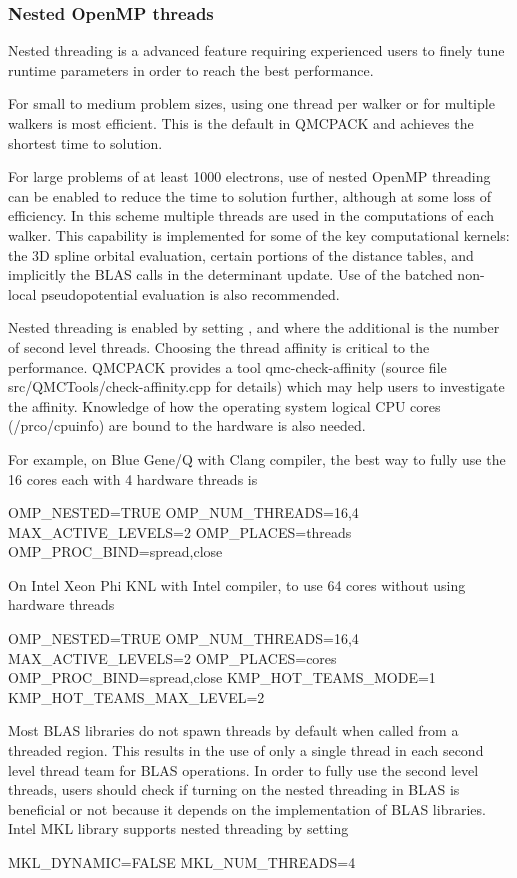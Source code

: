 \subsubsection{Nested OpenMP threads}
Nested threading is a advanced feature requiring experienced users to finely tune runtime parameters in order to reach the best performance.  

For small to medium problem sizes, using one thread per walker or for multiple walkers is most efficient. This is the default in QMCPACK and achieves the shortest time to solution.

For large problems of at least 1000 electrons, use of nested OpenMP threading can be enabled to reduce the time to solution further, although at some loss of efficiency. In this scheme multiple threads are used in the computations of each walker. This capability is implemented for some of the key computational kernels: the 3D spline orbital evaluation, certain portions of the distance tables, and implicitly the BLAS calls in the determinant update. Use of the batched non-local pseudopotential evaluation is also recommended.

Nested threading is enabled by setting ,  and  where the additional  is the number of second level threads.  Choosing the thread affinity is critical to the performance.  QMCPACK provides a tool qmc-check-affinity (source file src/QMCTools/check-affinity.cpp for details) which may help users to investigate the affinity. Knowledge of how the operating system logical CPU cores (/prco/cpuinfo) are bound to the hardware is also needed.

For example, on Blue Gene/Q with Clang compiler, the best way to fully use the 16 cores each with 4 hardware threads is
\begin{shade}
OMP_NESTED=TRUE
OMP_NUM_THREADS=16,4
MAX_ACTIVE_LEVELS=2
OMP_PLACES=threads
OMP_PROC_BIND=spread,close
\end{shade}

On Intel Xeon Phi KNL with Intel compiler, to use 64 cores without using hardware threads
\begin{shade}
OMP_NESTED=TRUE
OMP_NUM_THREADS=16,4
MAX_ACTIVE_LEVELS=2
OMP_PLACES=cores
OMP_PROC_BIND=spread,close
KMP_HOT_TEAMS_MODE=1
KMP_HOT_TEAMS_MAX_LEVEL=2
\end{shade}

Most BLAS libraries do not spawn threads by default when called from a threaded region.
This results in the use of only a single thread in each second level thread team for BLAS operations. In order to fully use the second level threads,
users should check if turning on the nested threading in BLAS is beneficial or not
because it depends on the implementation of BLAS libraries.
Intel MKL library supports nested threading by setting
\begin{shade}
MKL_DYNAMIC=FALSE
MKL_NUM_THREADS=4
\end{shade}

